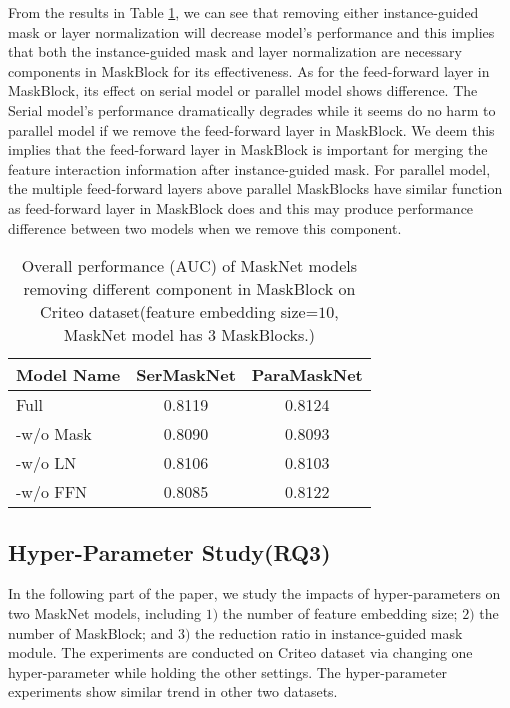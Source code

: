 \documentclass[sigconf]{acmart}
\begin{document}
From the results in Table \ref{tab:table4}, we can see that removing either instance-guided mask or layer normalization will decrease  model's performance and this implies that both the instance-guided mask and layer normalization are necessary components in  MaskBlock for its effectiveness. As for the feed-forward layer in MaskBlock, its effect on serial model or parallel model shows difference. The Serial model’s performance dramatically degrades while it seems do no harm to parallel model if we remove the feed-forward layer in MaskBlock. We deem this implies that the feed-forward layer in MaskBlock is important for merging the feature interaction information after instance-guided mask. For parallel model, the multiple feed-forward layers above parallel MaskBlocks have similar function as feed-forward layer in MaskBlock does and this  may produce performance difference between two models when we remove this component.

\begin{table}[h]
  \setlength{\abovecaptionskip}{1pt}
  \caption{Overall performance (AUC) of MaskNet models removing different component in MaskBlock on Criteo dataset(feature embedding size=$10$, MaskNet model has $3$ MaskBlocks.)}
  \label{tab:table4}
  \begin{tabular}{lcc}
  \toprule
   Model Name & SerMaskNet & ParaMaskNet \\
   \midrule
   Full & 0.8119 & 0.8124 \\
   \hline
   -w/o Mask & 0.8090 & 0.8093 \\
   -w/o  LN & 0.8106 & 0.8103 \\
   -w/o FFN & 0.8085 & 0.8122 \\
   \bottomrule
\end{tabular}
\end{table}




\subsection{Hyper-Parameter Study(RQ3)}
In the following part of the paper, we study the impacts of hyper-parameters on two MaskNet models, including $1)$ the number of feature embedding size; $2)$ the number of MaskBlock; and $3)$ the reduction ratio in instance-guided mask module. The experiments are conducted on Criteo dataset via changing one hyper-parameter while holding the other settings. The hyper-parameter experiments show similar trend in other two datasets.
\end{document}
